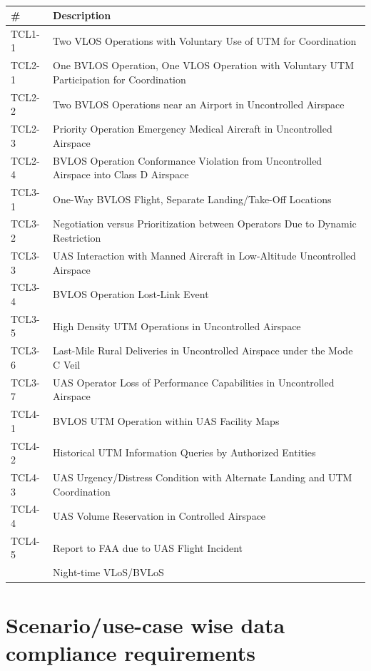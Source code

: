 \documentclass{ua_wgs_base}
\begin{document}
\begin{table}[tbh]
\begin{centering}
\begin{tabular}{|l|l|}
\hline 
\textbf{\#} & \textbf{Description}\tabularnewline
\hline 
\hline 
TCL1-1 & Two VLOS Operations with Voluntary Use of UTM for Coordination\tabularnewline
\hline 
TCL2-1 & One BVLOS Operation, One VLOS Operation with Voluntary UTM Participation
for Coordination\tabularnewline
\hline 
TCL2-2 & Two BVLOS Operations near an Airport in Uncontrolled Airspace\tabularnewline
\hline 
TCL2-3 & Priority Operation \textendash{} Emergency Medical Aircraft in Uncontrolled
Airspace\tabularnewline
\hline 
TCL2-4 & BVLOS Operation Conformance Violation from Uncontrolled Airspace into
Class D Airspace\tabularnewline
\hline 
TCL3-1 & One-Way BVLOS Flight, Separate Landing/Take-Off Locations\tabularnewline
\hline 
TCL3-2 & Negotiation versus Prioritization between Operators Due to Dynamic
Restriction\tabularnewline
\hline 
TCL3-3 & UAS Interaction with Manned Aircraft in Low-Altitude Uncontrolled
Airspace\tabularnewline
\hline 
TCL3-4 & BVLOS Operation Lost-Link Event\tabularnewline
\hline 
TCL3-5 & High Density UTM Operations in Uncontrolled Airspace\tabularnewline
\hline 
TCL3-6 & Last-Mile Rural Deliveries in Uncontrolled Airspace under the Mode
C Veil\tabularnewline
\hline 
TCL3-7 & UAS Operator Loss of Performance Capabilities in Uncontrolled Airspace\tabularnewline
\hline 
TCL4-1 & BVLOS UTM Operation within UAS Facility Maps\tabularnewline
\hline 
TCL4-2 & Historical UTM Information Queries by Authorized Entities\tabularnewline
\hline 
TCL4-3 & UAS Urgency/Distress Condition with Alternate Landing and UTM Coordination\tabularnewline
\hline 
TCL4-4 & UAS Volume Reservation in Controlled Airspace\tabularnewline
\hline 
TCL4-5 & Report to FAA due to UAS Flight Incident\tabularnewline
\hline 
 & Night-time VLoS/BVLoS\tabularnewline
\hline 
\end{tabular}
\par\end{centering}
\caption{}

\end{table}


\section{Scenario/use-case wise data compliance requirements}
\end{document}
